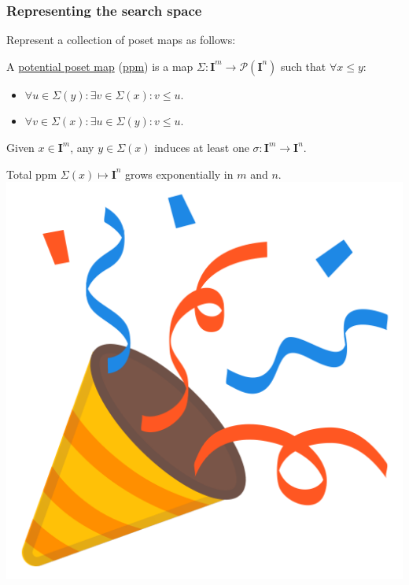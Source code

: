 \documentclass[xetex, mathserif, serif]{beamer}
\newcommand{\mname}[1]{\underline{{#1}}}
\newcommand{\pint}[1]{\mathbf{I}^{#1}}
\newcommand{\cont}[2]{ \ifthenelse{\equal{#2}{}}{#1}{{#1}\langle{#2}\rangle} }
\newcommand{\pow}[1]{\mathcal{P}({#1})}
\newcommand{\boundary}[1]{\partial({#1})}
\begin{document}




\begin{frame}
  \frametitle{Representing the search space}

  Represent a collection of poset maps as follows:

  \begin{block}{}
    A \mname{potential poset map} (\mname{ppm}) is a map $\Sigma : \pint{m} \to \pow{\pint{n}}$
    such that $\forall x \leq y$:
    \begin{itemize}
    \item $\forall u \in \Sigma(y) : \exists v \in \Sigma(x) : v \leq u$.
    \item $\forall v \in \Sigma(x) : \exists u \in \Sigma(y) : v \leq u$.
    \end{itemize}
  \end{block}

  Given $x \in \pint{m}$, any $y \in \Sigma(x)$ induces at least one
  $\sigma : \pint{m} \to \pint{n}$.
  
  Total ppm $\Sigma(x) \mapsto \pint{n}$ grows exponentially in $m$ and $n$. \pause\includegraphics[scale=.05]{img/party}


\end{frame}
\end{document}
